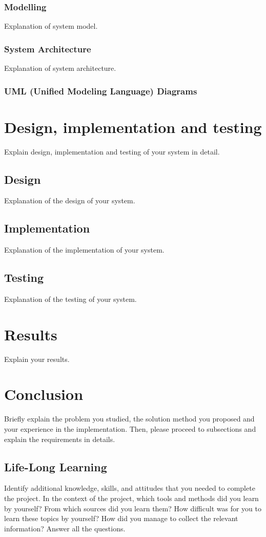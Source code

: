 \documentclass{mefsdp}
\begin{document}
	\subsubsection{Modelling}
	Explanation of system model.
	
	\subsubsection{System Architecture }
	Explanation of system architecture.
	
	\subsubsection{UML (Unified Modeling Language) Diagrams}
	
	\section{Design, implementation and testing}
	Explain design, implementation and testing of your system in detail.
	
	\subsection{Design}
	Explanation of the design of your system.
	
	\subsection{Implementation}
	Explanation of the implementation of your system.
	
	\subsection{Testing}
	Explanation of the testing of your system.
	
	\section{Results}
	Explain your results.
	
	\section{Conclusion}
	Briefly explain the problem you studied, the solution method you proposed and your experience in the implementation. Then, please proceed to subsections and explain the requirements in details. 
	
	\subsection{Life-Long Learning}
	Identify additional knowledge, skills, and attitudes that you needed to complete the project. In the context of the project, which tools and methods did you learn by yourself?  From which sources did you learn them? How difficult was for you to learn these topics by yourself? How did you manage to collect the relevant information? Answer all the questions.
	
\end{document}
